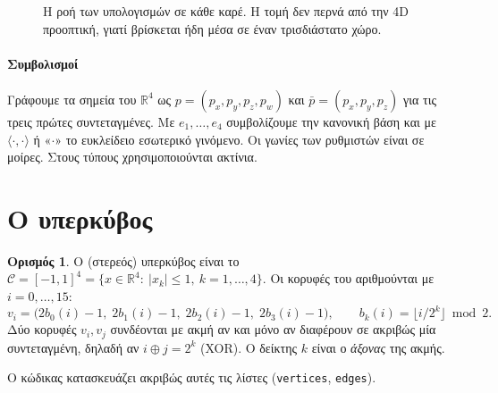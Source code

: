 \documentclass[10pt,a4paper]{article}
\theoremstyle{plain}
\theoremstyle{definition}
\newtheorem{definition}[theorem]{Ορισμός}
\newcommand{\R}{\mathbb{R}}
\newcommand{\C}{\mathcal{C}}
\newcommand{\V}{\mathcal{V}}
\newcommand{\code}[1]{\texttt{#1}}
\begin{document}
\begin{figure}[h]
\centering
{}
\caption{Η ροή των υπολογισμών σε κάθε καρέ. Η τομή δεν περνά από την 4D προοπτική, γιατί βρίσκεται ήδη μέσα σε έναν τρισδιάστατο χώρο.}
\label{fig:pipeline}
\end{figure}

\paragraph{Συμβολισμοί} Γράφουμε τα σημεία του $\R^4$ ως $p=(p_x,p_y,p_z,p_w)$ και $\bar p=(p_x,p_y,p_z)$ για τις τρεις πρώτες συντεταγμένες. Με $e_1,\dots,e_4$ συμβολίζουμε την κανονική βάση και με $\langle\cdot,\cdot\rangle$ ή «$\cdot$» το ευκλείδειο εσωτερικό γινόμενο. Οι γωνίες των ρυθμιστών είναι σε μοίρες. Στους τύπους χρησιμοποιούνται ακτίνια.

\section{Ο υπερκύβος}
\begin{definition}
Ο (στερεός) υπερκύβος είναι το $\C=[-1,1]^4=\{x\in\R^4:\ |x_k|\le1,\ k=1,\dots,4\}$. Οι κορυφές του αριθμούνται με $i=0,\dots,15$:
\[
v_i=\bigl(2b_0(i)-1,\;2b_1(i)-1,\;2b_2(i)-1,\;2b_3(i)-1\bigr),\qquad b_k(i)=\lfloor i/2^k\rfloor \bmod 2 .
\]
Δύο κορυφές $v_i,v_j$ συνδέονται με ακμή αν και μόνο αν διαφέρουν σε ακριβώς μία συντεταγμένη, δηλαδή αν $i\oplus j=2^k$ (XOR). Ο δείκτης $k$ είναι ο \emph{άξονας} της ακμής.
\end{definition}
Ο κώδικας κατασκευάζει ακριβώς αυτές τις λίστες (\code{vertices}, \code{edges}).
\end{document}
